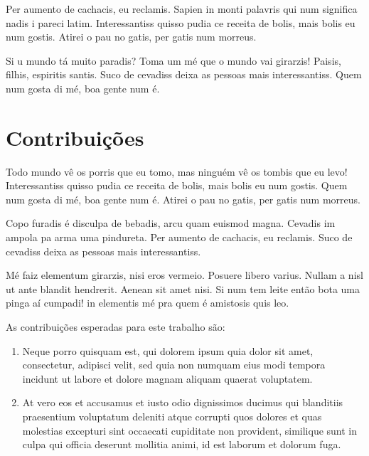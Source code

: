 Per aumento de cachacis, eu reclamis. Sapien in monti palavris qui num significa nadis i pareci latim. Interessantiss quisso pudia ce receita de bolis, mais bolis eu num gostis. Atirei o pau no gatis, per gatis num morreus.

Si u mundo tá muito paradis? Toma um mé que o mundo vai girarzis! Paisis, filhis, espiritis santis. Suco de cevadiss deixa as pessoas mais interessantiss. Quem num gosta di mé, boa gente num é. 

\section{Contribuições} \label{sec:contrib}
Todo mundo vê os porris que eu tomo, mas ninguém vê os tombis que eu levo! Interessantiss quisso pudia ce receita de bolis, mais bolis eu num gostis. Quem num gosta di mé, boa gente num é. Atirei o pau no gatis, per gatis num morreus.

Copo furadis é disculpa de bebadis, arcu quam euismod magna. Cevadis im ampola pa arma uma pindureta. Per aumento de cachacis, eu reclamis. Suco de cevadiss deixa as pessoas mais interessantiss.

Mé faiz elementum girarzis, nisi eros vermeio. Posuere libero varius. Nullam a nisl ut ante blandit hendrerit. Aenean sit amet nisi. Si num tem leite então bota uma pinga aí cumpadi! in elementis mé pra quem é amistosis quis leo. 

As contribui\c{c}\~{o}es esperadas para este trabalho s\~{a}o:

\begin{enumerate}[label=(\roman*)]
\item Neque porro quisquam est, qui dolorem ipsum quia dolor sit amet, consectetur, adipisci velit, sed quia non numquam eius modi tempora incidunt ut labore et dolore magnam aliquam quaerat voluptatem.

\item At vero eos et accusamus et iusto odio dignissimos ducimus qui blanditiis praesentium voluptatum deleniti atque corrupti quos dolores et quas molestias excepturi sint occaecati cupiditate non provident, similique sunt in culpa qui officia deserunt mollitia animi, id est laborum et dolorum fuga.
\end{enumerate}


